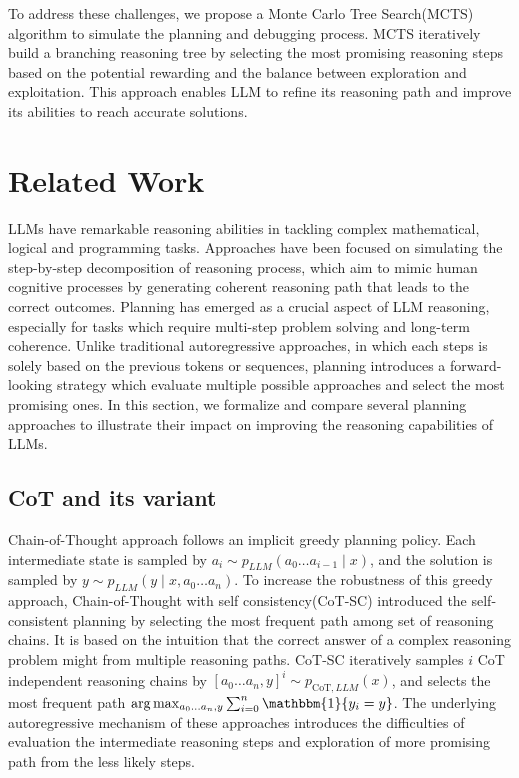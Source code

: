 \documentclass[11pt]{article}
\begin{document}
To address these challenges, we propose a Monte Carlo Tree Search(MCTS) algorithm to simulate the planning and debugging process. MCTS iteratively build a branching reasoning tree by selecting the most promising reasoning steps based on the potential rewarding and the balance between exploration and exploitation. This approach enables LLM to refine its reasoning path and improve its abilities to reach accurate solutions\citep{gao2024interpretablecontrastivemontecarlo}.

\section{Related Work}
LLMs have remarkable reasoning abilities in tackling complex mathematical, logical and programming tasks\citep{openai2024gpt4technicalreport}. Approaches have been focused on simulating the step-by-step decomposition of reasoning process, which aim to mimic human cognitive processes by generating coherent reasoning path that leads to the correct outcomes\citep{wei2023chainofthoughtpromptingelicitsreasoning}. Planning has emerged as a crucial aspect of LLM reasoning, especially for tasks which require multi-step problem solving and long-term coherence. Unlike traditional autoregressive approaches, in which each steps is solely based on the previous tokens or sequences, planning introduces a forward-looking strategy which evaluate multiple possible approaches and select the most promising ones\citep{hao2024llmreasonersnewevaluation}. In this section, we formalize and compare several planning approaches to illustrate their impact on improving the reasoning capabilities of LLMs. 


\subsection{CoT and its variant}  
Chain-of-Thought approach follows an implicit greedy planning policy. Each intermediate state is sampled by $ a_i \sim p_{LLM}(a_0 \ldots a_{i-1}\mid x) $, and the solution is sampled by $y\sim p_{LLM}(y\mid x, a_0 \ldots a_{n})$\citep{wei2023chainofthoughtpromptingelicitsreasoning}. To increase the robustness of this greedy approach, Chain-of-Thought with self consistency(CoT-SC) introduced the self-consistent planning by selecting the most frequent path among set of reasoning chains. It is based on the intuition that the correct answer of a complex reasoning problem might from multiple reasoning paths\citep{wang2023selfconsistencyimproveschainthought}. CoT-SC iteratively samples $i$ CoT independent reasoning chains by $[a_0\ldots a_n, y] ^i \sim p_{\text{CoT}, LLM}(x)$, and selects the most frequent path $\arg\max_{a_0 \ldots a_n, y} \sum_{i=0}^{n} \mathbbm{1}\{ y_i = y \}$. The underlying autoregressive mechanism of these approaches introduces the difficulties of evaluation the intermediate reasoning steps and exploration of more promising path from the less likely steps\citep{sprague2024cotcotchainofthoughthelps}. 
\end{document}
